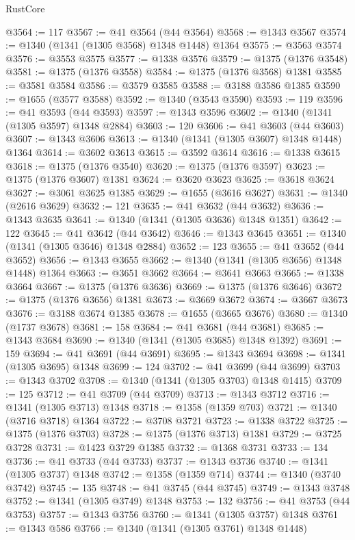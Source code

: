 \begin{lexlean}{RustCore}
\begin{coremodule}
@3564 := 117
@3567 := @41 @3564 (@44 @3564)
@3568 := @1343 @3567
@3574 := @1340 (@1341 (@1305 @3568) @1348 @1448) @1364
@3575 := @3563 @3574
@3576 := @3553 @3575
@3577 := @1338 @3576
@3579 := @1375 (@1376 @3548)
@3581 := @1375 (@1376 @3558)
@3584 := @1375 (@1376 @3568) @1381
@3585 := @3581 @3584
@3586 := @3579 @3585
@3588 := @3188 @3586 @1385
@3590 := @1655 (@3577 @3588)
@3592 := @1340 (@3543 @3590)
@3593 := 119
@3596 := @41 @3593 (@44 @3593)
@3597 := @1343 @3596
@3602 := @1340 (@1341 (@1305 @3597) @1348 @2884)
@3603 := 120
@3606 := @41 @3603 (@44 @3603)
@3607 := @1343 @3606
@3613 := @1340 (@1341 (@1305 @3607) @1348 @1448) @1364
@3614 := @3602 @3613
@3615 := @3592 @3614
@3616 := @1338 @3615
@3618 := @1375 (@1376 @3540)
@3620 := @1375 (@1376 @3597)
@3623 := @1375 (@1376 @3607) @1381
@3624 := @3620 @3623
@3625 := @3618 @3624
@3627 := @3061 @3625 @1385
@3629 := @1655 (@3616 @3627)
@3631 := @1340 (@2616 @3629)
@3632 := 121
@3635 := @41 @3632 (@44 @3632)
@3636 := @1343 @3635
@3641 := @1340 (@1341 (@1305 @3636) @1348 @1351)
@3642 := 122
@3645 := @41 @3642 (@44 @3642)
@3646 := @1343 @3645
@3651 := @1340 (@1341 (@1305 @3646) @1348 @2884)
@3652 := 123
@3655 := @41 @3652 (@44 @3652)
@3656 := @1343 @3655
@3662 := @1340 (@1341 (@1305 @3656) @1348 @1448) @1364
@3663 := @3651 @3662
@3664 := @3641 @3663
@3665 := @1338 @3664
@3667 := @1375 (@1376 @3636)
@3669 := @1375 (@1376 @3646)
@3672 := @1375 (@1376 @3656) @1381
@3673 := @3669 @3672
@3674 := @3667 @3673
@3676 := @3188 @3674 @1385
@3678 := @1655 (@3665 @3676)
@3680 := @1340 (@1737 @3678)
@3681 := 158
@3684 := @41 @3681 (@44 @3681)
@3685 := @1343 @3684
@3690 := @1340 (@1341 (@1305 @3685) @1348 @1392)
@3691 := 159
@3694 := @41 @3691 (@44 @3691)
@3695 := @1343 @3694
@3698 := @1341 (@1305 @3695) @1348
@3699 := 124
@3702 := @41 @3699 (@44 @3699)
@3703 := @1343 @3702
@3708 := @1340 (@1341 (@1305 @3703) @1348 @1415)
@3709 := 125
@3712 := @41 @3709 (@44 @3709)
@3713 := @1343 @3712
@3716 := @1341 (@1305 @3713) @1348
@3718 := @1358 (@1359 @703)
@3721 := @1340 (@3716 @3718) @1364
@3722 := @3708 @3721
@3723 := @1338 @3722
@3725 := @1375 (@1376 @3703)
@3728 := @1375 (@1376 @3713) @1381
@3729 := @3725 @3728
@3731 := @1423 @3729 @1385
@3732 := @1368 @3731
@3733 := 134
@3736 := @41 @3733 (@44 @3733)
@3737 := @1343 @3736
@3740 := @1341 (@1305 @3737) @1348
@3742 := @1358 (@1359 @714)
@3744 := @1340 (@3740 @3742)
@3745 := 135
@3748 := @41 @3745 (@44 @3745)
@3749 := @1343 @3748
@3752 := @1341 (@1305 @3749) @1348
@3753 := 132
@3756 := @41 @3753 (@44 @3753)
@3757 := @1343 @3756
@3760 := @1341 (@1305 @3757) @1348
@3761 := @1343 @586
@3766 := @1340 (@1341 (@1305 @3761) @1348 @1448)

\end{coremodule}
\end{lexlean}
